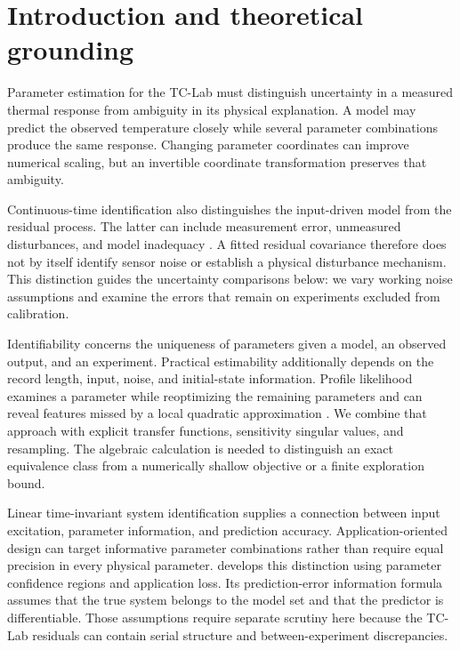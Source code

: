 \section{Introduction and theoretical grounding}
Parameter estimation for the TC-Lab must distinguish uncertainty in a measured
thermal response from ambiguity in its physical explanation. A model may predict
the observed temperature closely while several parameter combinations produce
the same response. Changing parameter coordinates can improve numerical scaling,
but an invertible coordinate transformation preserves that ambiguity.

Continuous-time identification also distinguishes the input-driven model from
the residual process. The latter can include measurement error, unmeasured
disturbances, and model inadequacy \citep{garnier-2008-direct}. A fitted residual
covariance therefore does not by itself identify sensor noise or establish a
physical disturbance mechanism. This distinction guides the uncertainty
comparisons below: we vary working noise assumptions and examine the errors
that remain on experiments excluded from calibration.

Identifiability concerns the uniqueness of parameters given a model, an observed
output, and an experiment. Practical estimability additionally depends on the
record length, input, noise, and initial-state information. Profile likelihood
examines a parameter while reoptimizing the remaining parameters and can reveal
features missed by a local quadratic approximation
\citep{raue-2009-structural}. We combine that approach with explicit transfer
functions, sensitivity singular values, and resampling. The algebraic calculation
is needed to distinguish an exact equivalence class from a numerically shallow
objective or a finite exploration bound.

Linear time-invariant system identification supplies a connection between input
excitation, parameter information, and prediction accuracy. Application-oriented
design can target informative parameter combinations rather than require equal
precision in every physical parameter. \citet{hjalmarsson-2009-system} develops
this distinction using parameter confidence regions and application loss. Its
prediction-error information formula assumes that the true system belongs to
the model set and that the predictor is differentiable. Those assumptions require
separate scrutiny here because the TC-Lab residuals can contain serial structure
and between-experiment discrepancies.

